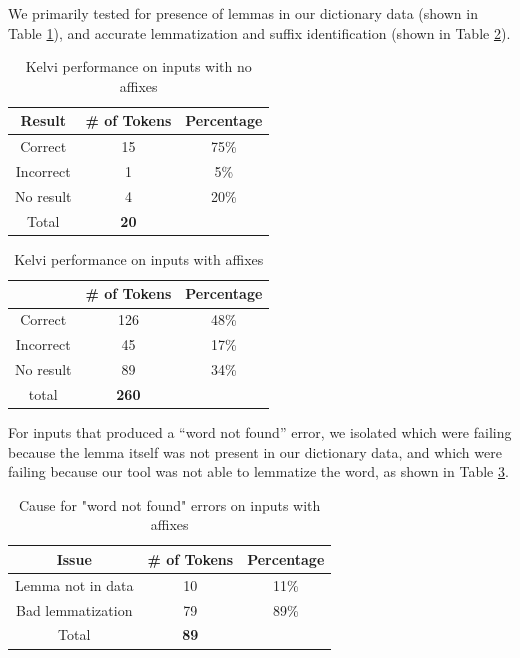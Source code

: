 \documentclass[11pt]{article}
\begin{document}
We primarily tested for presence of lemmas in our dictionary data (shown in Table \ref{tab:unconjugated}), 
and accurate lemmatization and suffix identification (shown in Table \ref{tab:conjugated}).
\begin{table}[ht]
  \center
  \begin{tabular}{c|c|c}
    Result & \# of Tokens & Percentage\\
    \hline
    Correct & 15 & 75\% \\
    Incorrect & 1 & 5\% \\
    No result & 4 & 20\% \\
    \hline
    Total & \textbf{20} & \\
  \end{tabular}
  \caption{Kelvi performance on inputs with no affixes}
  \label{tab:unconjugated}
  \vspace{-1.4em}
\end{table}

\begin{table}[ht]
  \center
  \begin{tabular}{c|c|c}
     & \# of Tokens & Percentage\\
    \hline
    Correct & 126 & 48\% \\
    Incorrect & 45 & 17\% \\
    No result & 89 & 34\% \\
    \hline
    total & \textbf{260} & \\
  \end{tabular}
  \caption{Kelvi performance on inputs with affixes}
  \label{tab:conjugated}
  \vspace{-4em}
\end{table}

For inputs that produced a “word not found” error, we isolated which were 
failing because the lemma itself was not present in our dictionary data, 
and which were failing because our tool was not able to lemmatize the word, 
as shown in Table \ref{tab:no-result}.
\begin{table}[ht]
  \center
  \begin{tabular}{c|c|c}
    Issue & \# of Tokens & Percentage\\
    \hline
    Lemma not in data & 10 & 11\% \\
    Bad lemmatization & 79 & 89\% \\
    \hline
    Total & \textbf{89} & \\
  \end{tabular}
  \caption{Cause for "word not found" errors on inputs with affixes}
  \label{tab:no-result}
\end{table}
\end{document}
